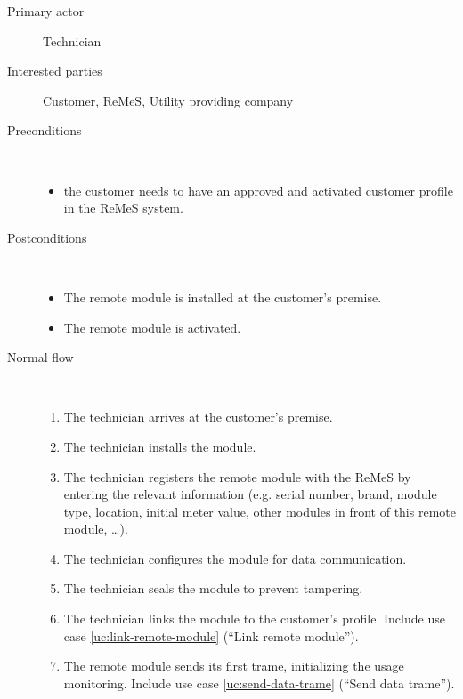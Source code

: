 \begin{description}
	\item[Primary actor] Technician
	\item[Interested parties] Customer, ReMeS, Utility providing company
	\item[Preconditions] \ 
	\begin{itemize}
	  	\item the customer needs to have an approved and activated customer profile
	  	in the ReMeS system.
	\end{itemize}
	\item[Postconditions] \ 
	\begin{itemize}
		\item The remote module is installed at the customer's premise.
		\item The remote module is activated.  
	\end{itemize}
	\item[Normal flow] \ 
	\begin{enumerate}
		\item The technician arrives at the customer's premise.
		\item The technician installs the module.
		\item The technician registers the remote module with the ReMeS by entering
		the relevant information (e.g. serial number, brand, module type, location,
		initial meter value, other modules in front of this remote module, \ldots).
		\item The technician configures the module for data communication.
		\item The technician seals the module to prevent tampering.
		\item The technician links the module to the customer's profile. Include use
		case \ref{uc:link-remote-module} (``Link remote module'').
		\item The remote module sends its first trame, initializing the usage
		monitoring. Include use case \ref{uc:send-data-trame} (``Send data trame'').
	\end{enumerate}
\end{description}